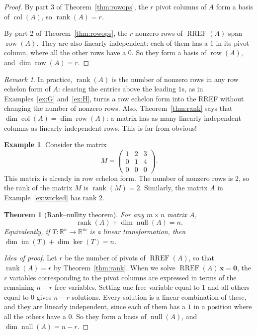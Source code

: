 \documentclass[11pt]{article}
\theoremstyle{definition}
\newtheorem{example}[definition]{Example}
\theoremstyle{plain}
\newtheorem{theorem}[definition]{Theorem}
\theoremstyle{remark}
\newtheorem{remark}[definition]{Remark}
\DeclareMathOperator{\im}{im}
\DeclareMathOperator{\rank}{rank}
\DeclareMathOperator{\Null}{null}
\DeclareMathOperator{\col}{col}
\DeclareMathOperator{\row}{row}
\DeclareMathOperator{\RREF}{RREF}
\begin{document}
\begin{proof}
    By part 3 of Theorem~\ref{thm:rowops}, the $r$ pivot columns of $A$ form a basis of $\col(A)$, so $\rank(A) = r$.

    By part 2 of Theorem~\ref{thm:rowops}, the $r$ nonzero rows of $\RREF(A)$ span $\row(A)$. They are also linearly independent: each of them has a $1$ in its pivot column, where all the other rows have a $0$. So they form a basis of $\row(A)$, and $\dim \row(A) = r$.
\end{proof}

\begin{remark}
    In practice, $\rank(A)$ is the number of nonzero rows in any row echelon form of $A$: clearing the entries above the leading $1$s, as in Examples~\ref{ex:G} and~\ref{ex:H}, turns a row echelon form into the RREF without changing the number of nonzero rows. Also, Theorem~\ref{thm:rank} says that $\dim \col(A) = \dim \row(A)$: a matrix has as many linearly independent columns as linearly independent rows. This is far from obvious!
\end{remark}

\begin{example}
    Consider the matrix
    \[M = \begin{pmatrix}
        1 & 2 & 3 \\
        0 & 1 & 4 \\
        0 & 0 & 0
    \end{pmatrix}.\]
    This matrix is already in row echelon form. The number of nonzero rows is $2$, so the rank of the matrix $M$ is $\rank(M) = 2$. Similarly, the matrix $A$ in Example~\ref{ex:worked} has rank $2$.
\end{example}

\begin{theorem}[Rank--nullity theorem]
    For any $m \times n$ matrix $A$,
    \[\rank(A) + \dim \Null(A) = n.\]
    Equivalently, if $T: \mathbb{R}^n \to \mathbb{R}^m$ is a linear transformation, then $\dim \im(T) + \dim \ker(T) = n$.
\end{theorem}

\begin{proof}[Idea of proof]
    Let $r$ be the number of pivots of $\RREF(A)$, so that $\rank(A) = r$ by Theorem~\ref{thm:rank}. When we solve $\RREF(A)\,\mathbf{x} = \mathbf{0}$, the $r$ variables corresponding to the pivot columns are expressed in terms of the remaining $n - r$ free variables. Setting one free variable equal to $1$ and all others equal to $0$ gives $n - r$ solutions. Every solution is a linear combination of these, and they are linearly independent, since each of them has a $1$ in a position where all the others have a $0$. So they form a basis of $\Null(A)$, and $\dim \Null(A) = n - r$.
\end{proof}
\end{document}
